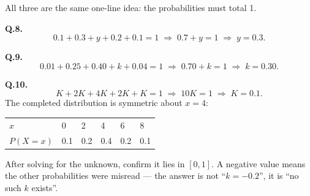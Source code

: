 \begin{solution}
All three are the same one-line idea: the probabilities must total 1.

\medskip
\textbf{Q.8.}
\[
0.1+0.3+y+0.2+0.1=1 \;\Longrightarrow\; 0.7+y=1 \;\Longrightarrow\; y=0.3 .
\]

\textbf{Q.9.}
\[
0.01+0.25+0.40+k+0.04=1 \;\Longrightarrow\; 0.70+k=1 \;\Longrightarrow\; k=0.30 .
\]

\textbf{Q.10.}
\[
K+2K+4K+2K+K=1 \;\Longrightarrow\; 10K=1 \;\Longrightarrow\; K=0.1 .
\]
The completed distribution is symmetric about $x=4$:

\begin{center}
\small\sffamily
\begin{tabular}{@{}l C{1.6cm} C{1.6cm} C{1.6cm} C{1.6cm} C{1.6cm}@{}}
\toprule
$x$      & 0   & 2   & 4   & 6   & 8   \\
$P(X=x)$ & 0.1 & 0.2 & 0.4 & 0.2 & 0.1 \\
\bottomrule
\end{tabular}
\end{center}


\end{solution}

\begin{pitfall}
After solving for the unknown, confirm it lies in $[0,1]$. A negative value
means the other probabilities were misread --- the answer is not ``$k=-0.2$'',
it is ``no such $k$ exists''.
\end{pitfall}
